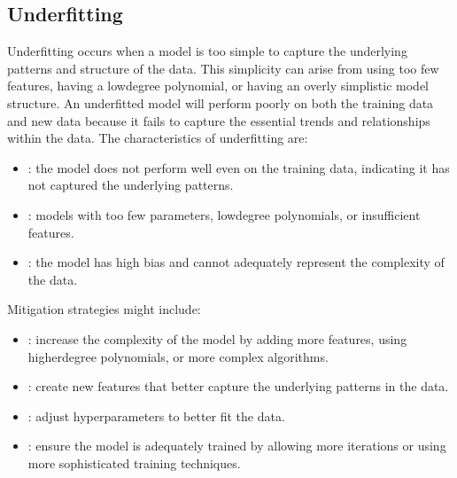 \documentclass[letterpaper,10pt,english]{jupyterBook}
\begin{document}
\subsection{Underfitting}
\label{\detokenize{notebooks/review_ML:underfitting}}
\sphinxAtStartPar
Underfitting occurs when a model is too simple to capture the underlying patterns and structure of the data. This simplicity can arise from using too few features, having a low\sphinxhyphen{}degree polynomial, or having an overly simplistic model structure. An underfitted model will perform poorly on both the training data and new data because it fails to capture the essential trends and relationships within the data. The characteristics of underfitting are:
\begin{itemize}
\item {} 
\sphinxAtStartPar
{}: the model does not perform well even on the training data, indicating it has not captured the underlying patterns.

\item {} 
\sphinxAtStartPar
{}: models with too few parameters, low\sphinxhyphen{}degree polynomials, or insufficient features.

\item {} 
\sphinxAtStartPar
{}: the model has high bias and cannot adequately represent the complexity of the data.

\end{itemize}

\sphinxAtStartPar
Mitigation strategies might include:
\begin{itemize}
\item {} 
\sphinxAtStartPar
{}: increase the complexity of the model by adding more features, using higher\sphinxhyphen{}degree polynomials, or more complex algorithms.

\item {} 
\sphinxAtStartPar
{}: create new features that better capture the underlying patterns in the data.

\item {} 
\sphinxAtStartPar
{}: adjust hyperparameters to better fit the data.

\item {} 
\sphinxAtStartPar
{}: ensure the model is adequately trained by allowing more iterations or using more sophisticated training techniques.

\end{itemize}
\end{document}
